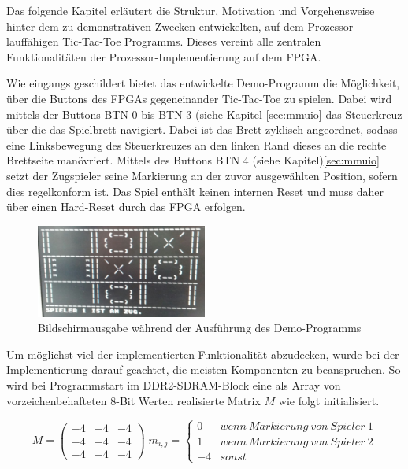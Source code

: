 
Das folgende Kapitel erläutert die Struktur, Motivation und Vorgehensweise hinter dem zu demonstrativen Zwecken entwickelten, auf dem Prozessor lauffähigen Tic-Tac-Toe Programms. Dieses vereint alle zentralen Funktionalitäten der Prozessor-Implementierung auf dem FPGA.


Wie eingangs geschildert bietet das entwickelte Demo-Programm die Möglichkeit, über die Buttons des FPGAs gegeneinander Tic-Tac-Toe zu spielen. Dabei wird mittels der Buttons BTN 0 bis BTN 3 (siehe Kapitel \ref{sec:mmuio} das Steuerkreuz über die das Spielbrett navigiert. Dabei ist das Brett zyklisch angeordnet, sodass eine Linksbewegung des Steuerkreuzes an den linken Rand dieses an die rechte Brettseite manövriert. Mittels des Buttons BTN 4 (siehe Kapitel)\ref{sec:mmuio} setzt der Zugspieler seine Markierung an der zuvor ausgewählten Position, sofern dies regelkonform ist. Das Spiel enthält keinen internen Reset und muss daher über einen Hard-Reset durch das FPGA erfolgen.

\begin{figure}[H]
	\centering
		\includegraphics[width=0.5\textwidth]{gameplay.png}
	\caption{Bildschirmausgabe w\"ahrend der Ausf\"uhrung des Demo-Programms}
	\label{fig:gameplay}
\end{figure}

Um möglichst viel der implementierten Funktionalität abzudecken, wurde bei der Implementierung darauf geachtet, die meisten Komponenten zu beanspruchen. So wird bei Programmstart im DDR2-SDRAM-Block eine als Array von vorzeichenbehafteten 8-Bit Werten realisierte Matrix $M$ wie folgt initialisiert.

\[ M = \begin{pmatrix} -4 & -4 & -4\\ -4 & -4 & -4\\ -4 & -4 & -4  \end{pmatrix}\;
 m_{i,j} = \begin{cases}
	0 & wenn\:Markierung\:von\:Spieler\:1 \\
	1 & wenn\:Markierung\:von\:Spieler\:2 \\
	-4 & sonst

\end{cases}\]

